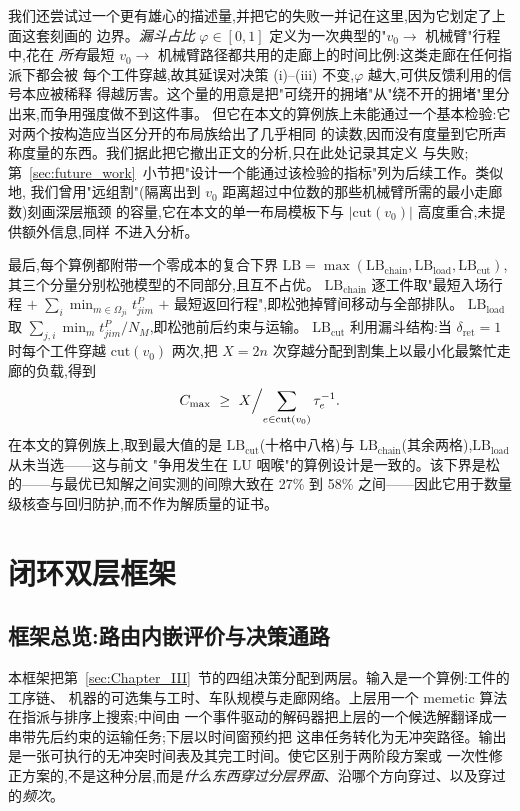 \documentclass[manuscript,screen,review]{acmart}
\newcommand{\LBGapLo}{27\%}
\newcommand{\LBGapHi}{58\%}
\begin{document}
我们还尝试过一个更有雄心的描述量,并把它的失败一并记在这里,因为它划定了上面这套刻画的
边界。\emph{漏斗占比} $\varphi\in[0,1]$ 定义为一次典型的"$v_0\to$ 机械臂"行程中,花在
\emph{所有}最短 $v_0\to$ 机械臂路径都共用的走廊上的时间比例:这类走廊在任何指派下都会被
每个工件穿越,故其延误对决策 (i)--(iii) 不变,$\varphi$ 越大,可供反馈利用的信号本应被稀释
得越厉害。这个量的用意是把"可绕开的拥堵"从"绕不开的拥堵"里分出来,而争用强度做不到这件事。
但它在本文的算例族上未能通过一个基本检验:它对两个按构造应当区分开的布局族给出了几乎相同
的读数,因而没有度量到它所声称度量的东西。我们据此把它撤出正文的分析,只在此处记录其定义
与失败;第~\ref{sec:future_work}~小节把"设计一个能通过该检验的指标"列为后续工作。类似地,
我们曾用"远组割"(隔离出到 $v_0$ 距离超过中位数的那些机械臂所需的最小走廊数)刻画深层瓶颈
的容量,它在本文的单一布局模板下与 $|\mathrm{cut}(v_0)|$ 高度重合,未提供额外信息,同样
不进入分析。

最后,每个算例都附带一个零成本的复合下界
$\mathrm{LB}=\max(\mathrm{LB}_{\text{chain}},\mathrm{LB}_{\text{load}},
\mathrm{LB}_{\text{cut}})$,其三个分量分别松弛模型的不同部分,且互不占优。
$\mathrm{LB}_{\text{chain}}$ 逐工件取"最短入场行程 $+$
$\sum_i \min_{m\in\Omega_{ji}}t^P_{jim}$ $+$ 最短返回行程",即松弛掉臂间移动与全部排队。
$\mathrm{LB}_{\text{load}}$ 取 $\sum_{j,i}\min_m t^P_{jim}/N_M$,即松弛前后约束与运输。
$\mathrm{LB}_{\text{cut}}$ 利用漏斗结构:当 $\delta_{\mathrm{ret}}=1$ 时每个工件穿越
$\mathrm{cut}(v_0)$ 两次,把 $X=2n$ 次穿越分配到割集上以最小化最繁忙走廊的负载,得到
\begin{equation}
\label{eq:lbcut}
C_{\max}\ \ge\ X\Bigl/\sum_{e\in \mathrm{cut}(v_0)}\tau_e^{-1}.
\end{equation}
在本文的算例族上,取到最大值的是 $\mathrm{LB}_{\text{cut}}$(十格中八格)与
$\mathrm{LB}_{\text{chain}}$(其余两格),$\mathrm{LB}_{\text{load}}$ 从未当选——这与前文
"争用发生在 LU 咽喉"的算例设计是一致的。该下界是松的——与最优已知解之间实测的间隙大致在
\LBGapLo{} 到 \LBGapHi{} 之间——因此它用于数量级核查与回归防护,而不作为解质量的证书。

\section{闭环双层框架}
\label{sec:Chapter_IV}
\subsection{框架总览:路由内嵌评价与决策通路}
\label{sec:overview}

本框架把第~\ref{sec:Chapter_III}~节的四组决策分配到两层。输入是一个算例:工件的工序链、
机器的可选集与工时、车队规模与走廊网络。上层用一个 memetic 算法在指派与排序上搜索;中间由
一个事件驱动的解码器把上层的一个候选解翻译成一串带先后约束的运输任务;下层以时间窗预约把
这串任务转化为无冲突路径。输出是一张可执行的无冲突时间表及其完工时间。使它区别于两阶段方案或
一次性修正方案的,不是这种分层,而是\emph{什么东西穿过分层界面}、沿哪个方向穿过、以及穿过
的\emph{频次}。
\end{document}
